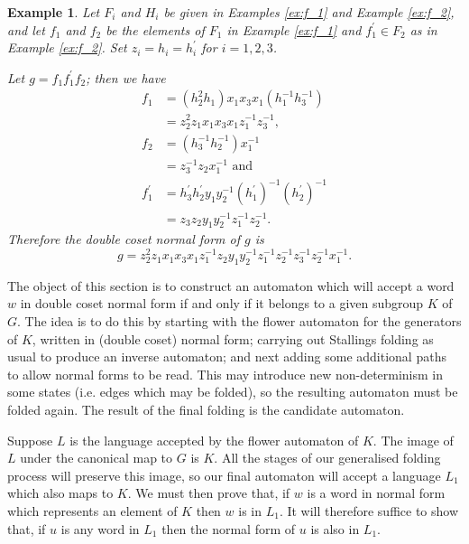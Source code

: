 \documentclass[a4paper,12pt]{article}
\newtheorem{exam}[theorem]{Example}
\newenvironment{example}{\begin{exam} \rm}{\end{exam}}
\numberwithin{equation}{section}
\numberwithin{figure}{section}
\begin{document}
\begin{example}\label{ex:g}
Let $F_i$ and $H_i$ be given in Examples \ref{ex:f_1} and
Example \ref{ex:f_2}, and
let $f_1$ and $f_2$ be the elements of $F_1$ in Example \ref{ex:f_1} and
$f_1^\prime\in F_2$ as in Example \ref{ex:f_2}.
Set $z_i = h_i = h_i^{\prime}$ for $i= 1,2,3$.

Let $g =f_1 f_1^\prime f_2$; then we have
\begin{align*}
f_1&=(h_2^{2}h_1) x_1x_3x_1 (h_1^{-1}h_3^{-1})\\
&=z_2^2z_1  x_1x_3x_1z_1^{-1}z_3^{-1},\\
f_2&=(h_3^{-1}h_2^{-1}) x_1^{-1}\\
&=z_3^{-1}z_2 x_1^{-1}\textrm{ and }\\
f_1^\prime&=h^\prime_3h_2^\prime y_1y_2^{-1} (h_1^\prime)^{-1}(h_2^\prime)^{-1}\\
&= z_3z_2 y_1y_2^{-1} z_1^{-1}z_2^{-1}.
\end{align*}
Therefore the double coset normal form of $g$ is
\[g=z_2^2 z_1  x_1 x_3 x_1 z_1^{-1}
z_2y_1y_2^{-1} z_1^{-1}z_2^{-1}
z_3^{-1}z_2^{-1} x_1^{-1}.
\]
\end{example}


The object of this section is to construct an automaton which will accept a word
$w$ in double coset normal form if and only if it belongs to a
given subgroup $K$ of $G$. The idea is to do this by starting with the
flower automaton for the generators of $K$, written in (double
coset) normal form; carrying out Stallings folding as usual to
produce an inverse automaton; and next
adding some additional paths to allow normal forms to be read.
This may introduce new non-determinism in some  states (i.e. edges
which may be folded), so the resulting automaton must be folded
again. The result of the final folding is the candidate automaton.

 Suppose $L$ is the
language accepted by the flower automaton of $K$. The image of $L$ under
the canonical map to $G$ is $K$. All the stages of our generalised folding
process will preserve this image, so our final automaton will accept a language
$L_1$ which also maps to $K$. We must then prove that, if $w$ is a word
in normal form which represents an element of $K$ then $w$ is in $L_1$. It will
therefore suffice to show that, if $u$ is any word in $L_1$ then the
normal form of $u$ is also in $L_1$.
\end{document}
